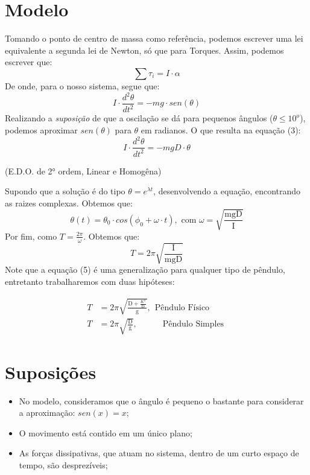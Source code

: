 \documentclass[hidelinks,a4paper,12pt]{article}
\begin{document}
\section*{Modelo}
\qquad Tomando o ponto de centro de massa como referência, 
podemos escrever uma lei equivalente a segunda lei de Newton, só que para Torques.
Assim, podemos escrever que:
\begin{equation}
    \sum{\tau_i} =  I\cdot \alpha
\end{equation}
\qquad De onde, para o nosso sistema, segue que:
\begin{equation}
    I \cdot \frac{d^2\theta}{dt ^2} = - mg\cdot sen(\theta)
\end{equation}
\qquad Realizando a \textit{suposição} de que a oscilação se dá para pequenos ângulos
($\theta \leq 10^{o} $), podemos aproximar $sen(\theta)$ para $\theta$ em radianos.
O que resulta na equação (3):
\begin{equation}
    I \cdot \frac{d^2\theta}{dt ^2} = - mgD\cdot \theta
\end{equation}
\begin{center}
    \small{(E.D.O. de 2° ordem, Linear e Homogêna)}
\end{center}
\qquad Supondo que a solução é do tipo $\theta = e^{\lambda t}$, desenvolvendo
a equação, encontrando as raizes complexas. Obtemos que:
\begin{equation}
    \theta(t) = \theta_0 \cdot cos\left( \phi_0 + \omega \cdot t\right), \text{ com } \omega = \sqrt{\frac{\text{mgD}}{\text{I}}}
\end{equation}
\qquad Por fim, como $T = \frac{2\pi}{\omega}$. Obtemos que:
\begin{equation}
   \boxed{T = 2\pi \sqrt{\frac{\text{I}}{\text{mgD}}}}
\end{equation}
\qquad Note que a equação (5) é uma generalização para qualquer
tipo de pêndulo, entretanto trabalharemos com duas hipóteses:


\begin{align}
        T &= 2\pi \sqrt{\frac{\text{D} + \frac{\text{$K^2$}}{\text{D}}}{\text{g}}}, \ \ \text{Pêndulo Físico }\\
        T &= 2\pi \sqrt{\frac{\text{D}}{\text{g}}},\quad \qquad \text{Pêndulo Simples }
\end{align}

\section*{Suposições}
\begin{itemize}
    \item No modelo, consideramos que o ângulo é pequeno o bastante para considerar a aproximação: \(sen(x) = x\);
    \item O movimento está contido em um único plano;
    \item As forças dissipativas, que atuam no sistema, dentro de um curto espaço de tempo, são desprezíveis;
\end{itemize}
\end{document}
